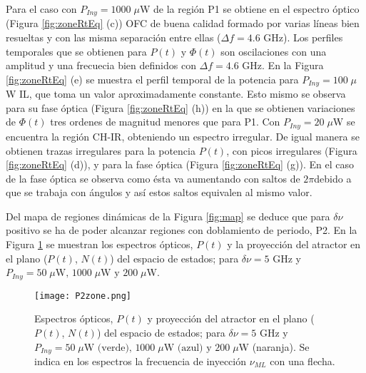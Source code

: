 			Para el caso con $P_{Iny} = 1000\;\mu$W de la región P1 se obtiene en el espectro óptico (Figura \ref{fig:zoneRtEq} (c)) OFC de buena calidad formado por varias líneas bien resueltas y con las misma separación entre ellas ($\Delta f = 4.6$ GHz). Los perfiles temporales que se obtienen para $P(t)$ y $\Phi(t)$ son oscilaciones con una amplitud y una frecuecia bien definidos con $\Delta f = 4.6$ GHz. En la Figura \ref{fig:zoneRtEq} (e)  se muestra el perfil temporal de la potencia para $P_{Iny} = 100\;\mu$W IL, que toma un valor aproximadamente constante. Esto mismo se observa para su fase óptica (Figura \ref{fig:zoneRtEq} (h)) en la que se obtienen variaciones de $\Phi(t)$ tres ordenes de magnitud menores que para P1. Con $P_{Iny} = 20\;\mu$W se encuentra la región CH-IR, obteniendo un espectro irregular. De igual manera se obtienen trazas irregulares para la potencia $P(t)$, con picos irregulares (Figura \ref{fig:zoneRtEq} (d)), y para la fase \'optica (Figura \ref{fig:zoneRtEq} (g)). En el caso de la fase \'optica se observa como \'esta va aumentando con saltos de $2 \pi$debido a que se trabaja con \'angulos y as\'i estos saltos equivalen al mismo valor. 

			Del mapa de regiones dinámicas de la Figura \ref{fig:map} se deduce que para $\delta\nu$ positivo se ha de poder alcanzar regiones con doblamiento de periodo, P2. En la Figura \ref{fig:P2zone} se muestran los espectros ópticos, $P(t)$ y la proyecci\'on del atractor en el plano ($P(t)$, $N(t)$) del espacio de estados; para $\delta\nu = 5$ GHz y $P_{Iny} = 50\;\mu \textrm{W, } 1000\;\mu\textrm{W y } 200\;\mu$W.

			\begin{figure}[H]
				\centering
				\texttt{[image: P2zone.png]}
				\caption{\label{fig:P2zone}Espectros ópticos, $P(t)$ y proyecci\'on del atractor en el plano ($P(t)$, $N(t)$) del espacio de estados; para $\delta\nu = 5$ GHz y $P_{Iny} = 50\;\mu \textrm{W (verde), } 1000\;\mu\textrm{W (azul) y } 200\;\mu$W (naranja). Se indica en los espectros la frecuencia de inyección $\nu_{ML}$ con una flecha.}	
			\end{figure}

